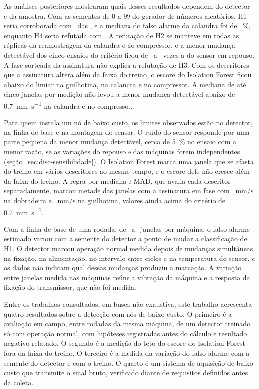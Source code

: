 As análises posteriores mostraram quais desses resultados dependem do detector e da amostra. Com as sementes de 0 a \num{99} do gerador de números aleatórios, H1 seria corroborada com \apTresVereditoUmCorroborada\ das \apTresSementes, e a mediana do falso alarme da calandra foi de \apTresSementeCalandraMed~\%, enquanto H4 seria refutada com \apTresVereditoQuatroRefutada. A refutação de H2 se manteve em todas as réplicas da reamostragem da calandra e do compressor, e a menor mudança detectável dos cinco ensaios do critério ficou de \apCincoRazaoMin\ a \apCincoRazaoMax\ vezes a do sensor em repouso. A fase sorteada da assinatura não explica a refutação de H3. Com os descritores que a assinatura altera além da faixa do treino, o escore do Isolation Forest ficou abaixo do limiar na guilhotina, na calandra e no compressor. A mediana de até cinco janelas por medição não levou a menor mudança detectável abaixo de \SI{0,7}{\milli\meter\per\second} na calandra e no compressor.

Para quem instala um nó de baixo custo, os limites observados estão no detector, na linha de base e na montagem do sensor. O ruído do sensor responde por uma parte pequena da menor mudança detectável, cerca de \SI{5}{\percent} no ensaio com a menor razão, se as variações do repouso e das máquinas forem independentes (seção~\ref{sec:disc-sensibilidade}). O Isolation Forest marca uma janela que se afasta do treino em vários descritores ao mesmo tempo, e o escore dele não cresce além da faixa do treino. A regra por mediana e MAD, que avalia cada descritor separadamente, marcou metade das janelas com a assinatura em fase com \apUmMadAcinquentaZeroDobradeira~mm/s na dobradeira e \apUmMadAcinquentaZeroGuilhotina~mm/s na guilhotina, valores ainda acima do critério de \SI{0,7}{\milli\meter\per\second}.

Com a linha de base de uma rodada, de \campoJanelasGuilhotinaUm\ a \campoJanelasCalandraUm\ janelas por máquina, o falso alarme estimado variou com a semente do detector a ponto de mudar a classificação de H1. O detector marcou operação normal medida depois de mudanças simultâneas na fixação, na alimentação, no intervalo entre ciclos e na temperatura do sensor, e os dados não indicam qual dessas mudanças produziu a marcação. A variação entre janelas medida nas máquinas reúne a vibração da máquina e a resposta da fixação do transmissor, que não foi medida.

Entre os trabalhos consultados, em busca não exaustiva, este trabalho acrescenta quatro resultados sobre a detecção com nós de baixo custo. O primeiro é a avaliação em campo, entre rodadas da mesma máquina, de um detector treinado só com operação normal, com hipóteses registradas antes do cálculo e resultado negativo relatado. O segundo é a medição do teto do escore do Isolation Forest fora da faixa do treino. O terceiro é a medida da variação do falso alarme com a semente do detector e com o treino. O quarto é um sistema de aquisição de baixo custo que transmite o sinal bruto, verificado diante de requisitos definidos antes da coleta.

